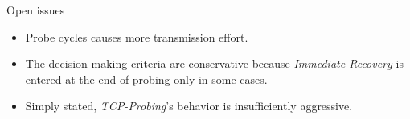 \begin{frame}{Open issues}
       \begin{itemize}
	    \item Probe cycles causes more transmission effort.
	    \item The decision-making criteria are conservative
		  because \textit{Immediate Recovery} is entered at the end of
		  probing only in some cases.
	    \item Simply stated, \textit{TCP-Probing}'s
		  behavior is insufficiently aggressive.
       \end{itemize}
\end{frame}


